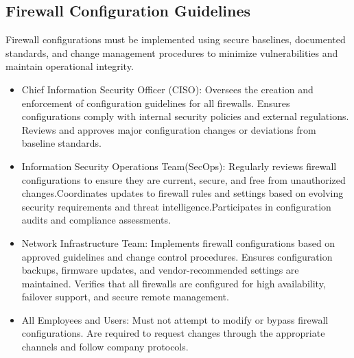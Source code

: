     \subsection{Firewall Configuration Guidelines}
    Firewall configurations must be implemented using secure baselines, documented standards, and change management procedures to minimize vulnerabilities and maintain operational integrity.
\begin{itemize}
    \item Chief Information Security Officer (CISO): Oversees the creation and enforcement of configuration guidelines for all firewalls. Ensures configurations comply with internal security policies and external regulations. Reviews and approves major configuration changes or deviations from baseline standards.

    \item Information Security Operations Team(SecOps): Regularly reviews firewall configurations to ensure they are current, secure, and free from unauthorized changes.Coordinates updates to firewall rules and settings based on evolving security requirements and threat intelligence.Participates in configuration audits and compliance assessments.
    
    \item Network Infrastructure Team: Implements firewall configurations based on approved guidelines and change control procedures. Ensures configuration backups, firmware updates, and vendor-recommended settings are maintained. Verifies that all firewalls are configured for high availability, failover support, and secure remote management.
    
    \item All Employees and Users: Must not attempt to modify or bypass firewall configurations. Are required to request changes through the appropriate channels and follow company protocols.

\end{itemize}
